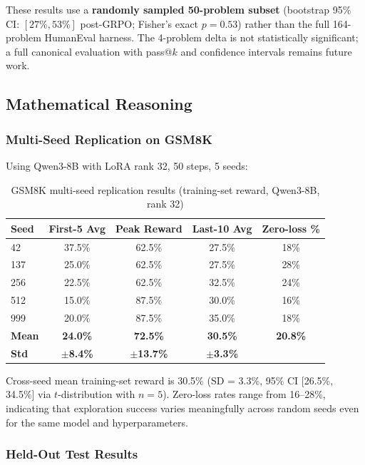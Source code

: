 \documentclass{article}
\begin{document}
These results use a \textbf{randomly sampled 50-problem subset} (bootstrap 95\% CI: $[27\%, 53\%]$ post-GRPO; Fisher's exact $p{=}0.53$) rather than the full 164-problem HumanEval harness. The 4-problem delta is not statistically significant; a full canonical evaluation with pass@$k$ and confidence intervals remains future work.

\subsection{Mathematical Reasoning}

\subsubsection{Multi-Seed Replication on GSM8K}

Using Qwen3-8B with LoRA rank 32, 50 steps, 5 seeds:

\begin{table}[htbp]
    \centering
    \caption{GSM8K multi-seed replication results (training-set reward, Qwen3-8B, rank 32)}
    \begin{tabular}{lcccc}
        \toprule
        Seed & First-5 Avg & Peak Reward & Last-10 Avg & Zero-loss \% \\
        \midrule
        42  & 37.5\% & 62.5\% & 27.5\% & 18\% \\
        137 & 25.0\% & 62.5\% & 27.5\% & 28\% \\
        256 & 22.5\% & 62.5\% & 32.5\% & 24\% \\
        512 & 15.0\% & 87.5\% & 30.0\% & 16\% \\
        999 & 20.0\% & 87.5\% & 35.0\% & 18\% \\
        \midrule
        \textbf{Mean} & \textbf{24.0\%} & \textbf{72.5\%} & \textbf{30.5\%} & \textbf{20.8\%} \\
        \textbf{Std} & \textbf{$\pm$8.4\%} & \textbf{$\pm$13.7\%} & \textbf{$\pm$3.3\%} & \\
        \bottomrule
    \end{tabular}
    \label{tab:multiseed}
\end{table}

Cross-seed mean training-set reward is 30.5\% (SD = 3.3\%, 95\% CI [26.5\%, 34.5\%] via $t$-distribution with $n=5$). Zero-loss rates range from 16--28\%, indicating that exploration success varies meaningfully across random seeds even for the same model and hyperparameters.

\subsubsection{Held-Out Test Results}
\label{sec:gsm8k_heldout}
\end{document}
